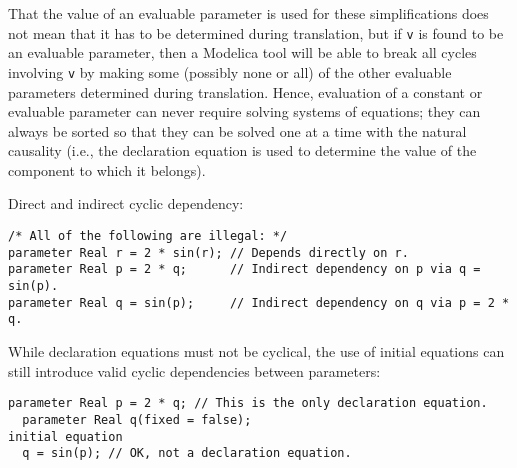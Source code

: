 That the value of an evaluable parameter is used for these simplifications does not mean that it has to be determined during translation, but if \lstinline!v! is found to be an evaluable parameter, then a Modelica tool will be able to break all cycles involving \lstinline!v! by making some (possibly none or all) of the other evaluable parameters determined during translation.
Hence, evaluation of a constant or evaluable parameter can never require solving systems of equations; they can always be sorted so that they can be solved one at a time with the natural causality (i.e., the declaration equation is used to determine the value of the component to which it belongs).

\begin{example}
Direct and indirect cyclic dependency:
\begin{lstlisting}[language=modelica]
/* All of the following are illegal: */
parameter Real r = 2 * sin(r); // Depends directly on r.
parameter Real p = 2 * q;      // Indirect dependency on p via q = sin(p).
parameter Real q = sin(p);     // Indirect dependency on q via p = 2 * q.
\end{lstlisting}
\end{example}

\begin{example}
While declaration equations must not be cyclical, the use of initial equations can still introduce valid cyclic dependencies between parameters:
\begin{lstlisting}[language=modelica]
  parameter Real p = 2 * q; // This is the only declaration equation.
  parameter Real q(fixed = false);
initial equation
  q = sin(p); // OK, not a declaration equation.
\end{lstlisting}
\end{example}

